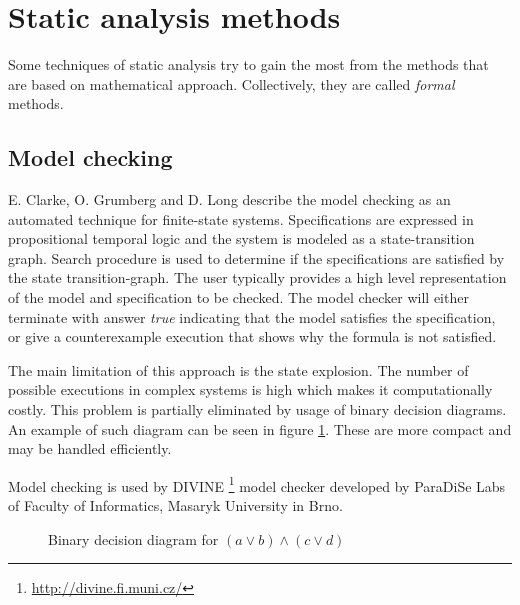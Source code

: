 \documentclass[12pt,final,oneside]{fithesis2}
\theoremstyle{definition}
\begin{document}
\section{Static analysis methods}

Some techniques of static analysis try to gain the most from the methods
that are based on mathematical approach. Collectively, they are called
\textit{formal} methods.


\subsection{Model checking}

E. Clarke, O. Grumberg and D. Long \cite{Clarke99-1} describe the model
checking as an automated technique for finite-state systems. Specifications
are expressed in propositional temporal logic and the system is modeled
as a state-transition graph. Search procedure is used to determine if the
specifications are satisfied by the state transition-graph. The user typically
provides a high level representation of the model and specification to be
checked. The model checker will either terminate with answer \textit{true}
indicating that the model satisfies the specification, or give
a counterexample execution that shows why the formula is not satisfied.

The main limitation of this approach is the state explosion. The number
of possible executions in complex systems is high which makes it
computationally costly. This problem is partially eliminated by usage
of binary decision diagrams. An example of such diagram can be seen in
figure \ref{fig:bdd}. These are more compact and may be handled
efficiently.

Model checking is used by DIVINE \footnote{\url{http://divine.fi.muni.cz/}}
model checker developed by ParaDiSe Labs of Faculty of Informatics,
Masaryk University in Brno.

\begin{figure}[ht]
\centering
{}
\caption{Binary decision diagram for $(a \lor b) \land (c \lor d)$}
\label{fig:bdd}
\end{figure}
\end{document}
